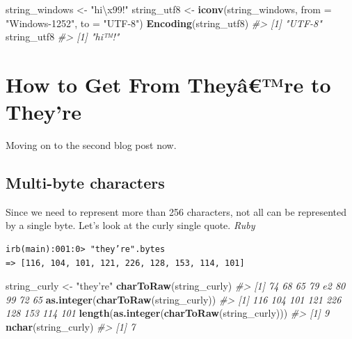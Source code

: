 \documentclass[
]{book}
\newenvironment{Shaded}{\begin{snugshade}}{\end{snugshade}}
\newcommand{\CharTok}[1]{\textcolor[rgb]{0.31,0.60,0.02}{#1}}
\newcommand{\CommentTok}[1]{\textcolor[rgb]{0.56,0.35,0.01}{\textit{#1}}}
\newcommand{\DataTypeTok}[1]{\textcolor[rgb]{0.13,0.29,0.53}{#1}}
\newcommand{\KeywordTok}[1]{\textcolor[rgb]{0.13,0.29,0.53}{\textbf{#1}}}
\newcommand{\NormalTok}[1]{#1}
\newcommand{\StringTok}[1]{\textcolor[rgb]{0.31,0.60,0.02}{#1}}
\begin{document}
\begin{Shaded}
\begin{Highlighting}[]
\NormalTok{string_windows <-}\StringTok{ "hi}\CharTok{\textbackslash{}x99}\StringTok{!"}
\NormalTok{string_utf8 <-}\StringTok{ }\KeywordTok{iconv}\NormalTok{(string_windows, }\DataTypeTok{from =} \StringTok{"Windows-1252"}\NormalTok{, }\DataTypeTok{to =} \StringTok{"UTF-8"}\NormalTok{)}
\KeywordTok{Encoding}\NormalTok{(string_utf8)}
\CommentTok{#> [1] "UTF-8"}
\NormalTok{string_utf8}
\CommentTok{#> [1] "hi™!"}
\end{Highlighting}
\end{Shaded}

\hypertarget{how-to-get-from-theyuxe2re-to-theyre}{%
\section{How to Get From Theyâ€™re to They're}\label{how-to-get-from-theyuxe2re-to-theyre}}

Moving on to the second blog post now.

\hypertarget{multi-byte-characters}{%
\subsection{Multi-byte characters}\label{multi-byte-characters}}

Since we need to represent more than 256 characters, not all can be represented by a single byte. Let's look at the curly single quote. \emph{Ruby}

\begin{verbatim}
irb(main):001:0> "they’re".bytes
=> [116, 104, 101, 121, 226, 128, 153, 114, 101]
\end{verbatim}

\begin{Shaded}
\begin{Highlighting}[]
\NormalTok{string_curly <-}\StringTok{ "they’re"}
\KeywordTok{charToRaw}\NormalTok{(string_curly)}
\CommentTok{#> [1] 74 68 65 79 e2 80 99 72 65}
\KeywordTok{as.integer}\NormalTok{(}\KeywordTok{charToRaw}\NormalTok{(string_curly))}
\CommentTok{#> [1] 116 104 101 121 226 128 153 114 101}
\KeywordTok{length}\NormalTok{(}\KeywordTok{as.integer}\NormalTok{(}\KeywordTok{charToRaw}\NormalTok{(string_curly)))}
\CommentTok{#> [1] 9}
\KeywordTok{nchar}\NormalTok{(string_curly)}
\CommentTok{#> [1] 7}
\end{Highlighting}
\end{Shaded}
\end{document}
